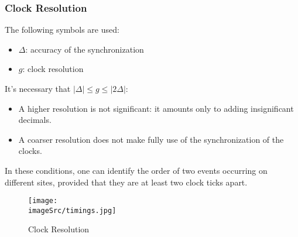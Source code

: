 \documentclass[../main.tex]{subfiles}
\begin{document}
\subsubsection{Clock Resolution}
The following symbols are used:
\begin{itemize}
	\item $\Delta$: accuracy of the synchronization
	\item $g$: clock resolution
\end{itemize}
It's necessary that $| \Delta | \leq g \leq | 2 \Delta |$:
\begin{itemize}
	\item A higher resolution is not significant: it amounts only to adding insignificant decimals.
	\item A coarser resolution does not make fully use of the synchronization of the clocks.
\end{itemize}
In these conditions, one can identify the order of two events occurring on different sites, provided that they are at least two clock ticks apart.

\begin{figure}[H]
    \centering
    \texttt{[image: \\imageSrc/timings.jpg]}
    \caption{Clock Resolution}
    \label{mcosii}
\end{figure}
\end{document}
